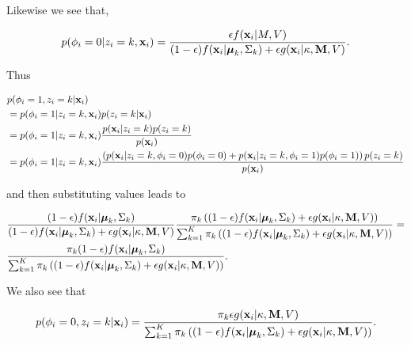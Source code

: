 \documentclass[12pt,english]{article}\usepackage[]{graphicx}\usepackage[]{color}
\begin{document}
Likewise we see that,

\begin{equation}
\begin{split}
p(\phi_i = 0|z_i = k , {\bf x}_i ) = \frac{\epsilon f({\bf x}_i|M, V)}{(1-\epsilon) f({\bf x}_i|\boldsymbol{\mu}_k, \Sigma_k) + \epsilon g({\bf x}_i|\kappa, {\bf M}, V)}.
\end{split}
\end{equation}

Thus

\begin{equation}
\begin{split}
& p(\phi_i = 1, z_i = k| {\bf x}_i ) \\
& = p(\phi_i = 1|z_i = k, {\bf x}_i)p(z_i = k|{\bf x}_i)\\
& = p(\phi_i = 1|z_i = k, {\bf x}_i)\frac{p({\bf x}_i|z_i = k)p(z_i = k)}{p({\bf x}_i)}\\
& = p(\phi_i = 1|z_i = k, {\bf x}_i)\frac{\left(p({\bf x}_i|z_i = k,\phi_i =0)p(\phi_i=0) + p({\bf x}_i|z_i = k,\phi_i =1)p(\phi_i=1) \right)p(z_i = k)}{p({\bf x}_i)}\\
\end{split}
\end{equation}

and then substituting values leads to

\begin{equation}
\begin{split}
& \frac{(1-\epsilon)f({\bf x}_i|\boldsymbol{\mu}_k, \Sigma_{k})}{ (1-\epsilon) f({\bf x}_i|\boldsymbol{\mu}_k, \Sigma_k) + \epsilon g({\bf x}_i|\kappa, {\bf M}, V)}\frac{\pi_k \left((1-\epsilon)f({\bf x}_i|\boldsymbol{\mu}_k, \Sigma_{k}) + \epsilon g({\bf x}_i|\kappa, {\bf M}, V)\right)}{\sum_{k=1}^{K}\pi_k\left((1-\epsilon) f({\bf x}_i|\boldsymbol{\mu}_k, \Sigma_k) + \epsilon g({\bf x}_i|\kappa, {\bf M}, V)\right)} = \\
& \frac{\pi_k(1-\epsilon)f({\bf x}_i|\boldsymbol{\mu}_k, \Sigma_{k})}{\sum_{k=1}^{K}\pi_k\left((1-\epsilon) f({\bf x}_i|\boldsymbol{\mu}_k, \Sigma_k) + \epsilon g({\bf x}_i|\kappa, {\bf M}, V)\right)}.\\
\end{split}
\end{equation}

We also see that

\begin{equation}
p(\phi_i = 0, z_i = k| {\bf x}_i ) = \frac{\pi_k \epsilon g({\bf x}_i|\kappa, {\bf M}, V)}{\sum_{k=1}^{K}\pi_k\left((1-\epsilon) f({\bf x}_i|\boldsymbol{\mu}_k, \Sigma_k) + \epsilon g({\bf x}_i|\kappa, {\bf M}, V)\right)}.
\end{equation}
\end{document}
